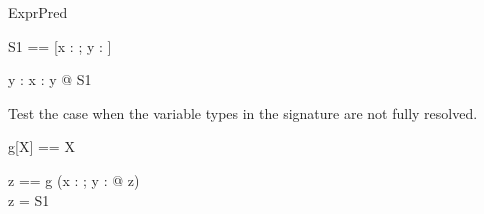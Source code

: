 \begin{zsection}
  \SECTION ExprPred
\end{zsection}

\begin{zed}
  S1 == [x : \nat; y : \power \nat]
\end{zed}

\begin{axdef}
  y : \power \nat
\where
  \exists x : y @ S1
\end{axdef}

Test the case when the variable types in the signature are not fully
resolved.

\begin{zed}
  g[X] == X
\end{zed}

\begin{axdef}
  z == g
\where
  (\exists x : \nat; y : \power \nat @ z)\\
  z = S1
\end{axdef}
